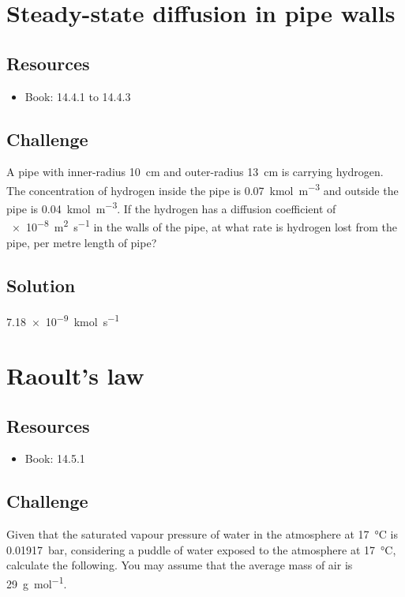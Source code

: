 \newpage
\section{Steady-state diffusion in pipe walls}

\subsection*{Resources}
\begin{itemize}
    \item Book: 14.4.1 to 14.4.3
\end{itemize}

\subsection*{Challenge}
A pipe with inner-radius \SI{10}{\cm} and outer-radius \SI{13}{\cm} is carrying hydrogen. The concentration of hydrogen inside the pipe is \SI{0.07}{\kmol\per\cubic\meter} and outside the pipe is \SI{0.04}{\kmol\per\cubic\meter}. If the hydrogen has a diffusion coefficient of \SI{e-8}{\square\meter\per\second} in the walls of the pipe, at what rate is hydrogen lost from the pipe, per metre length of pipe?

\subsection*{Solution}
\SI{7.18e-9}{\kmol\per\second}




\newpage
\section{Raoult's law}

\subsection*{Resources}
\begin{itemize}
    \item Book: 14.5.1
\end{itemize}

\subsection*{Challenge}
Given that the saturated vapour pressure of water in the atmosphere at \SI{17}{\celsius} is \SI{0.01917}{\bar}, considering a puddle of water exposed to the atmosphere at \SI{17}{\celsius}, calculate the following. You may assume that the average mass of air is \SI{29}{\gram\per\mol}.

